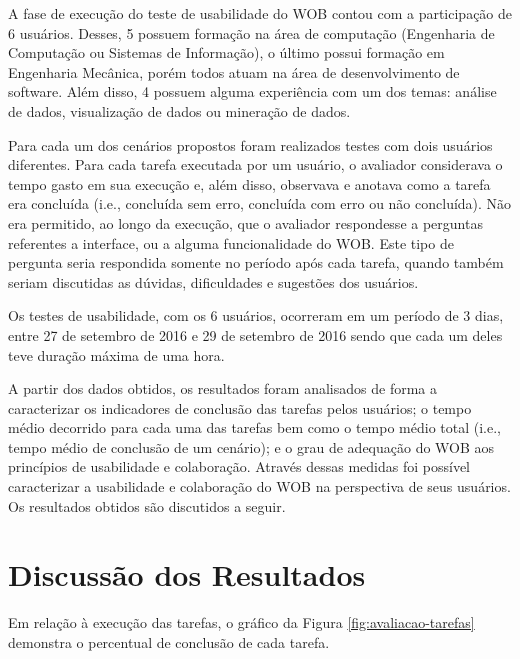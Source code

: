 A fase de execução do teste de usabilidade do WOB contou com a participação de 6 usuários. 
Desses, 5 possuem formação na área de computação (Engenharia de Computação ou Sistemas de 
Informação), o último possui formação em Engenharia Mecânica, porém todos atuam na área de 
desenvolvimento de software. Além disso, 4 possuem alguma experiência com um dos temas: 
análise de dados, visualização de dados ou mineração de dados.

Para cada um dos cenários propostos foram realizados testes com dois usuários diferentes. 
Para cada tarefa executada por um usuário, o avaliador considerava o tempo gasto em sua 
execução e, além disso, observava e anotava como a tarefa era concluída (i.e., concluída 
sem erro, concluída com erro ou não concluída). Não era permitido, ao longo da execução,
que o avaliador respondesse a perguntas referentes a interface, ou a alguma funcionalidade 
do WOB. Este tipo de pergunta seria respondida somente no período após cada tarefa, quando 
também seriam discutidas as dúvidas, dificuldades e sugestões dos usuários. 

Os testes de usabilidade, com os 6 usuários, ocorreram em um período de 3 dias, entre 27 de 
setembro de 2016 e 29 de setembro de 2016 sendo que cada um deles teve duração máxima de 
uma hora.

A partir dos dados obtidos, os resultados foram analisados de forma a caracterizar os 
indicadores de conclusão das tarefas pelos usuários; o tempo médio decorrido para cada uma 
das tarefas bem como o tempo médio total (i.e., tempo médio de conclusão de um cenário); e 
o grau de adequação do WOB aos princípios de usabilidade e colaboração. Através dessas 
medidas foi possível caracterizar a usabilidade e colaboração do WOB na perspectiva de 
seus usuários. Os resultados obtidos são discutidos a seguir.

\section{Discussão dos Resultados}
\label{sec:metodologia-resultados}

Em relação à execução das tarefas, o gráfico da Figura \ref{fig:avaliacao-tarefas} demonstra 
o percentual de conclusão de cada tarefa.

